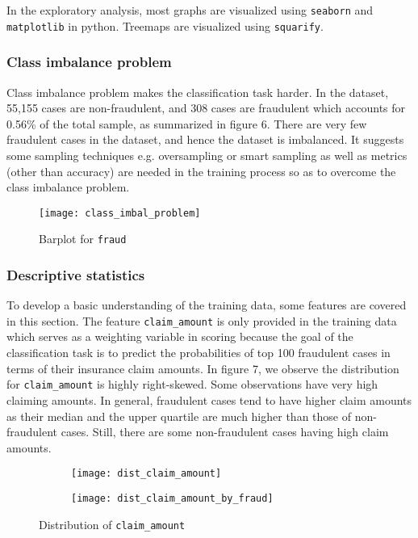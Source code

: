 \documentclass[12pt]{article}
\begin{document}
In the exploratory analysis, most graphs are visualized using \texttt{seaborn} and \texttt{matplotlib} in python. Treemaps are visualized using \texttt{squarify}.

\subsubsection*{Class imbalance problem}

Class imbalance problem makes the classification task harder. In the dataset, 55,155 cases are non-fraudulent, and 308 cases are fraudulent which accounts for 0.56\% of the total sample, as summarized in figure 6. There are very few fraudulent cases in the dataset, and hence the dataset is imbalanced. It suggests some sampling techniques e.g. oversampling or smart sampling as well as metrics (other than accuracy) are needed in the training process so as to overcome the class imbalance problem.

\begin{figure}[h]
\centering
\texttt{[image: class\_imbal\_problem]}
\vspace{-0.5cm}
\caption{Barplot for \texttt{fraud}}
\end{figure}

\vspace{-1cm}
\subsubsection*{Descriptive statistics}

To develop a basic understanding of the training data, some features are covered in this section. The feature \texttt{claim\_amount} is only provided in the training data which serves as a weighting variable in scoring because the goal of the classification task is to predict the probabilities of top 100 fraudulent cases in terms of their insurance claim amounts. In figure 7, we observe the distribution for \texttt{claim\_amount} is highly right-skewed. Some observations have very high claiming amounts. In general, fraudulent cases tend to have higher claim amounts as their median and the upper quartile are much higher than those of non-fraudulent cases. Still, there are some non-fraudulent cases having high claim amounts. 

\begin{figure}[h]
\centering
\begin{subfigure}{.5\textwidth}
  \centering
  \texttt{[image: dist\_claim\_amount]}
  \label{fig:sub1}
\end{subfigure}%
\begin{subfigure}{.5\textwidth}
  \centering
  \texttt{[image: dist\_claim\_amount\_by\_fraud]}
  \label{fig:sub2}
\end{subfigure}
\vspace{-1cm}
\caption{Distribution of \texttt{claim\_amount}}
\label{fig:test}
\end{figure}
\end{document}
